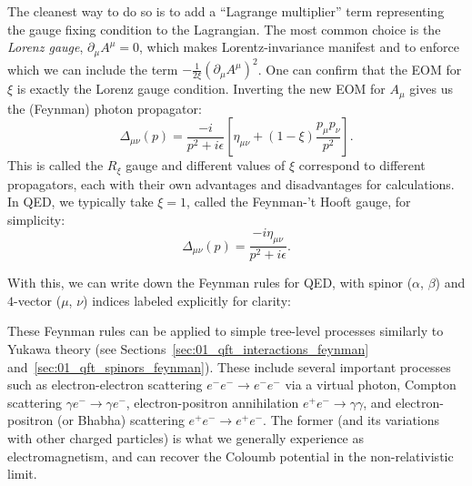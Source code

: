 The cleanest way to do so is to add a ``Lagrange multiplier'' term representing the gauge fixing condition to the Lagrangian.
The most common choice is the \textit{Lorenz gauge}, $\partial_\mu A^\mu = 0$, which makes Lorentz-invariance manifest and to enforce which we can include the term $-\frac{1}{2\xi}(\partial_\mu A^\mu)^2$.
One can confirm that the EOM for $\xi$ is exactly the Lorenz gauge condition.
Inverting the new EOM for $A_\mu$ gives us the (Feynman) photon propagator:
\begin{equation}
	\label{eq:01_qft_gt_maxwell_photon_propagator}
	\Delta_{\mu\nu}(p) = \frac{-i}{p^2 + i\epsilon}\left[ \eta_{\mu\nu} + (1-\xi)\frac{p_\mu p_\nu}{p^2} \right].
\end{equation}
This is called the $R_\xi$ gauge and different values of $\xi$ correspond to different propagators, each with their own advantages and disadvantages for calculations.
In QED, we typically take $\xi = 1$, called the Feynman-'t Hooft gauge, for simplicity:
\begin{equation}
	\label{eq:01_qft_gt_maxwell_photon_propagator_feynman}
	\Delta_{\mu\nu}(p) = \frac{-i \eta_{\mu\nu}}{p^2 + i\epsilon}.
\end{equation}

\begin{definition}
	\label{def:01_qft_gt_maxwell_feynman}
	With this, we can write down the Feynman rules for QED, with spinor ($\alpha$, $\beta$) and $4$-vector ($\mu$, $\nu$) indices labeled explicitly for clarity:
	
\end{definition}


These Feynman rules can be applied to simple tree-level processes similarly to Yukawa theory (see Sections~\ref{sec:01_qft_interactions_feynman} and~\ref{sec:01_qft_spinors_feynman}).
These include several important processes such as electron-electron scattering $e^-e^- \rightarrow e^-e^-$ via a virtual photon, Compton scattering $\gamma e^- \rightarrow \gamma e^-$, electron-positron annihilation $e^+e^- \rightarrow \gamma\gamma$, and electron-positron (or Bhabha) scattering $e^+e^- \rightarrow e^+e^-$.
The former (and its variations with other charged particles) is what we generally experience as electromagnetism, and can recover the Coloumb potential in the non-relativistic limit.


